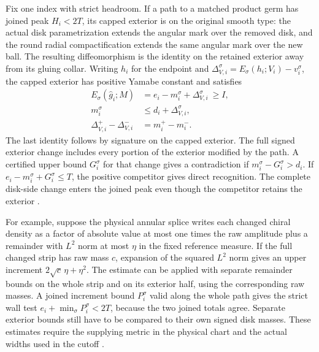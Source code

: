 \documentclass[11pt,letterpaper]{article}
\numberwithin{equation}{section}
\theoremstyle{remark}
\begin{document}
Fix one index with strict headroom. If a path to a
matched product germ has joined peak \(H_i<2T\),
its capped exterior is on the original smooth type:
the actual disk parametrization extends the angular
mark over the removed disk, and the round radial
compactification extends the same angular mark over
the new ball. The resulting diffeomorphism is the
identity on the retained exterior away from its
gluing collar. Writing \(h_i\) for the endpoint
and \(\Delta_{V,i}^\sigma=E_\sigma(h_i;V_i)-v_i^\sigma\),
the capped exterior has positive Yamabe constant
and satisfies
\begin{align}
 E_\sigma(\widehat g_i;M)
 &=e_i-m_i^\sigma+\Delta_{V,i}^\sigma\ \ge I,\label{eq:ext}\\
 m_i^\sigma&\le d_i+\Delta_{V,i}^\sigma,\label{eq:mass}\\
 \Delta_{V,i}^+-\Delta_{V,i}^-&=m_i^+-m_i^-.\label{eq:asym}
\end{align}
The last identity follows by signature on the capped
exterior. The full signed exterior change includes
every portion of the exterior modified by the path.
A certified upper bound \(G_i^\sigma\) for that change
gives a contradiction if \(m_i^\sigma-G_i^\sigma>d_i\).
If \(e_i-m_i^\sigma+G_i^\sigma\le T\), the positive
competitor gives direct recognition. The complete
disk-side change enters the joined peak even though
the competitor retains the exterior
\cite[Simultaneous removal of marked standard disks]{Baker2026FixedDescent}.

For example, suppose the physical annular splice
writes each changed chiral density as a factor of
absolute value at most one times the raw amplitude
plus a remainder with \(L^2\) norm at most \(\eta\)
in the fixed reference measure. If the full changed
strip has raw mass \(c\), expansion of the squared
\(L^2\) norm gives an upper increment
\(2\sqrt c\,\eta+\eta^2\). The estimate can be applied
with separate remainder bounds on the whole strip and
on its exterior half, using the corresponding raw
masses. A joined increment bound \(P_i^\sigma\) valid
along the whole path gives the strict wall test
\(e_i+\min_\sigma P_i^\sigma<2T\), because the two
joined totals agree. Separate exterior bounds still
have to be compared to their own signed disk masses.
These estimates require the supplying metric in the
physical chart and the actual widths used in the cutoff
\cite[First-order splice]{Baker2026CollarDeformation}
\cite{Baker2026FixedDescent,Baker2026CollarDeformation}.
\end{document}
